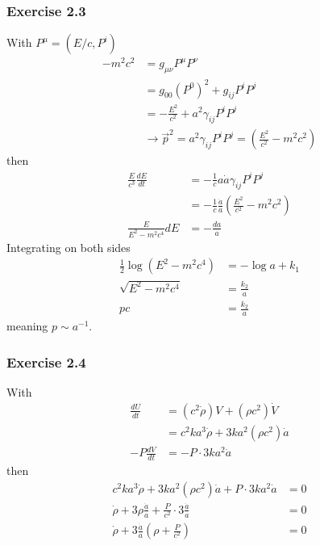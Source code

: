 \documentclass[10pt,a4paper]{book}
\theoremstyle{definition}
\begin{document}
\subsubsection{Exercise 2.3}
With $P^\mu=(E/c,P^i)$
\begin{align}
-m^2c^2
&=g_{\mu\nu}P^\mu P^\nu\\
&=g_{00}(P^0)^2+g_{ij}P^iP^j\\
&=-\frac{E^2}{c^2}+a^2\gamma_{ij}P^iP^j\\
&\rightarrow \vec{p}^2=a^2\gamma_{ij}P^iP^j=\left(\frac{E^2}{c^2}-m^2c^2\right)
\end{align}
then
\begin{align}
\frac{E}{c^3}\frac{dE}{dt}
&=-\frac{1}{c}a\dot{a}\gamma_{ij}P^iP^j\\
&=-\frac{1}{c}\frac{\dot{a}}{a}\left(\frac{E^2}{c^2}-m^2c^2\right)\\
\frac{E}{E^2-m^2c^4}dE&=-\frac{da}{a}
\end{align}
Integrating on both sides
\begin{align}
\frac{1}{2}\log(E^2-m^2c^4)&=-\log a+k_1\\
\sqrt{E^2-m^2c^4}&=\frac{k_2}{a}\\
pc&=\frac{k_2}{a}
\end{align}
meaning $p\sim a^{-1}$.


\subsubsection{Exercise 2.4}
With
\begin{align}
\frac{dU}{dt}
&=(c^2\dot\rho)V+(\rho c^2)\dot V\\
&=c^2ka^3\dot\rho+3ka^2(\rho c^2)\dot a\\
-P\frac{dV}{dt}
&=-P\cdot3ka^2\dot a
\end{align}
then
\begin{align}
c^2ka^3\dot\rho+3ka^2(\rho c^2)\dot a+P\cdot3ka^2\dot a&=0\\
\dot\rho+3\rho\frac{\dot a}{a}+\frac{P}{c^2}\cdot3\frac{\dot a}{a}&=0\\
\dot\rho+3\frac{\dot a}{a}\left(\rho+\frac{P}{c^2}\right)&=0
\end{align}
\end{document}
